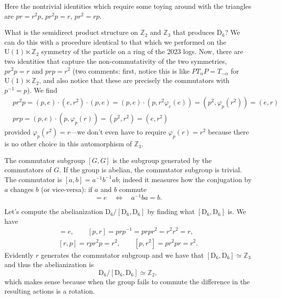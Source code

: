 \documentclass{report}
\begin{document}
Here the nontrivial identities which require some toying around with the 
triangles are $ pr = r^2 p $, $ pr^2 p = r $, $ pr^2 = rp $.

 What is the semidirect product structure on $
\mathbb{Z}_2 $ and $ \mathbb{Z}_3 $ that produces $ \text{D}_6 $?
We can do this with a procedure identical to that which we performed on the 
$ \text{U}(1)\ltimes \mathbb{Z}_2 $ symmetry of the particle on a ring of the
2023 logs. Now, there are two identities that capture the non-commutativity 
of the two symmetries, $ pr^2p = r $ and $ prp  = r^2 $ (two comments: first, 
notice this is like $ PT_{\alpha} P = T_{-\alpha} $ for $ \text{U}(1)\ltimes
\mathbb{Z}_2 $, and also notice that these are precisely the commutators with 
$ p^{-1} = p $). We find 
\begin{align*}
	&pr^2 p = (p,e) \cdot (e, r^2)\cdot(p, e)
		= (p, e)\cdot(p, r^2 \varphi_e(e))
		= (p^2, \varphi_p(r^2))
		= (e, r)\\ 
	&prp = (p, e) \cdot (p, \varphi_p(r)) = (p^2, r^2) = (e, r^2)
\end{align*}
provided $ \varphi_p(r^2) = r $---we don't even have to require $ \varphi_p(r) = r^2 $ because there is no other choice in this automorphism of $ \mathbb{Z}_3 $.

 The commutator subgroup $ [G, G] $ is the subgroup generated 
by the commutators of $ G $. If the group is abelian, the commutator subgroup 
is trivial. The commutator is $ [a,b] = a^{-1} b^{-1} a b$; indeed it measures how 
the conjugation by $ a $ changes $ b $ (or vice-versa): if $ a $ and $ b $
commute
\begin{equation*}
	[a,b] = e \quad \iff \quad a^{-1} b a = b.
\end{equation*}

 Let's compute the abelianization $ \text{D}_6 /
[\text{D}_6,\text{D}_6] $ by finding what $ [\text{D}_6, \text{D}_6] $ is. 
We have 
\begin{align*}
	[r, r^2] = e, \qquad [p, r] = prp^{-1} = prpr^2 = r^2 r^2 = r, \\ 
	[r, p] = rpr^2 p = r^2 ,\qquad [p, r^2] = pr^2 pr = r^2.
\end{align*}
Evidently $ r $ generates the commutator subgroup and we have that $
[\text{D}_6, \text{D}_6] \simeq \mathbb{Z}_3$ and thus the abelianization is 
\begin{equation*}
	\text{D}_6/[\text{D}_6, \text{D}_6] \simeq \mathbb{Z}_2,
\end{equation*}
which makes sense because when the group fails to commute the difference in the 
resulting actions is a rotation.
\end{document}
